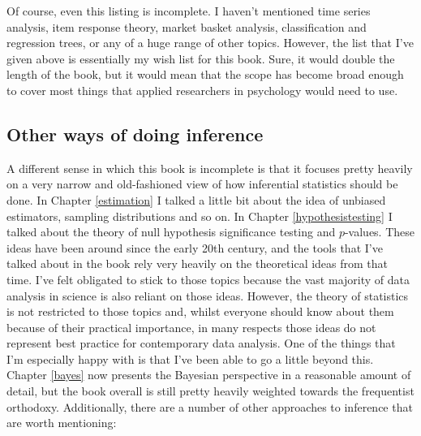 \documentclass[
]{book}
\begin{document}
Of course, even this listing is incomplete. I haven't mentioned time series analysis, item response theory, market basket analysis, classification and regression trees, or any of a huge range of other topics. However, the list that I've given above is essentially my wish list for this book. Sure, it would double the length of the book, but it would mean that the scope has become broad enough to cover most things that applied researchers in psychology would need to use.

\hypertarget{other-ways-of-doing-inference}{%
\subsection{Other ways of doing inference}\label{other-ways-of-doing-inference}}

A different sense in which this book is incomplete is that it focuses pretty heavily on a very narrow and old-fashioned view of how inferential statistics should be done. In Chapter \ref{estimation} I talked a little bit about the idea of unbiased estimators, sampling distributions and so on. In Chapter \ref{hypothesistesting} I talked about the theory of null hypothesis significance testing and \(p\)-values. These ideas have been around since the early 20th century, and the tools that I've talked about in the book rely very heavily on the theoretical ideas from that time. I've felt obligated to stick to those topics because the vast majority of data analysis in science is also reliant on those ideas. However, the theory of statistics is not restricted to those topics and, whilst everyone should know about them because of their practical importance, in many respects those ideas do not represent best practice for contemporary data analysis. One of the things that I'm especially happy with is that I've been able to go a little beyond this. Chapter \ref{bayes} now presents the Bayesian perspective in a reasonable amount of detail, but the book overall is still pretty heavily weighted towards the frequentist orthodoxy. Additionally, there are a number of other approaches to inference that are worth mentioning:
\end{document}
